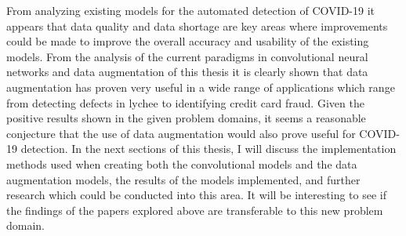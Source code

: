 From analyzing existing models for the automated detection of COVID-19 it appears that data quality and data shortage are key areas where improvements could be made to improve the overall accuracy and usability of the existing models.  From the analysis of the current paradigms in convolutional neural networks and data augmentation of this thesis it is clearly shown that data augmentation has proven very useful in a wide range of applications which range from detecting defects in lychee to  identifying credit card fraud.  Given the positive results shown in the given problem domains, it seems a reasonable conjecture that the use of data augmentation would also prove useful for COVID-19 detection.  In the next sections of this thesis, I will discuss the implementation methods used when creating both the convolutional models and the data augmentation models, the results of the models implemented, and further research which could be conducted into this area.  It will be interesting to see if the findings of the papers explored above are transferable to this new problem domain.